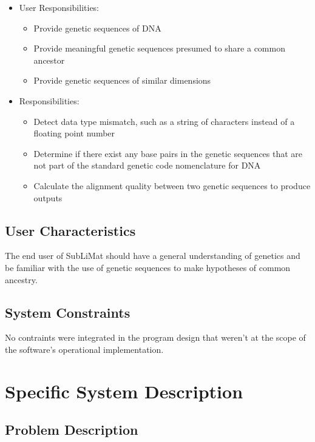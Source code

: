 \documentclass[12pt]{article}
\begin{document}
\begin{itemize}
\item User Responsibilities:
\begin{itemize}
\item Provide genetic sequences of DNA
\item Provide meaningful genetic sequences presumed to share a common ancestor
\item Provide genetic sequences of similar dimensions
\end{itemize}
\item \progname{} Responsibilities:
\begin{itemize}
\item Detect data type mismatch, such as a string of characters instead of a
  floating point number
\item Determine if there exist any base pairs in the genetic sequences that are
  not part of the standard genetic code nomenclature for DNA
\item Calculate the alignment quality between two genetic sequences to produce outputs
\end{itemize}
\end{itemize}



\subsection{User Characteristics} \label{SecUserCharacteristics}

The end user of SubLiMat should have a general understanding of genetics and be familiar 
with the use of genetic sequences to make hypotheses of common ancestry.


\subsection{System Constraints}

No contraints were integrated in the program design that weren't at the scope of the 
\progname{} software's operational implementation.


\section{Specific System Description}




\subsection{Problem Description} \label{Sec_pd}
\end{document}
